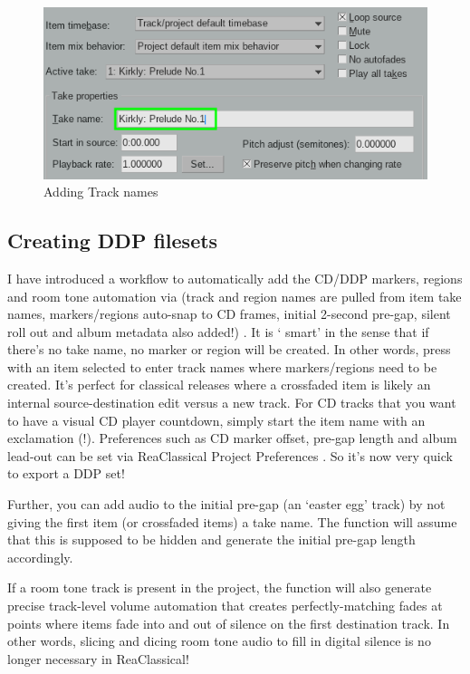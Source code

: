 \documentclass[10pt,american]{article}
\begin{document}
\begin{figure}
\begin{centering}
\includegraphics[scale=0.75]{user_guide_images/takename}
\par\end{centering}
\caption{Adding Track names}

\end{figure}


\subsection{Creating DDP filesets}

I have introduced a workflow to automatically add the CD/DDP markers, regions
and room tone automation via  (track and region names are pulled from
item take names, markers/regions auto-snap to CD frames, initial 2-second
pre-gap, silent roll out and album metadata also added!) . It is \textquoteleft
smart\textquoteright{} in the sense that if there's no take name, no marker or
region will be created. In other words, press  with an item selected to
enter track names where markers/regions need to be created. It's perfect for
classical releases where a crossfaded item is likely an internal
source-destination edit versus a new track. For CD tracks that you want to have
a visual CD player countdown, simply start the item name with an exclamation
(!). Preferences such as CD marker offset, pre-gap length and album lead-out can
be set via ReaClassical Project Preferences  . So it's now very quick
to export a DDP set! 

Further, you can add audio to the initial pre-gap (an `easter egg' track) by not
giving the first item (or crossfaded items) a take name. The function will
assume that this is supposed to be hidden and generate the initial pre-gap
length accordingly. 

If a room tone track is present in the project, the function will also generate
precise track-level volume automation that creates perfectly-matching fades at
points where items fade into and out of silence on the first destination track.
In other words, slicing and dicing room tone audio to fill in digital silence is
no longer necessary in ReaClassical!
\end{document}
